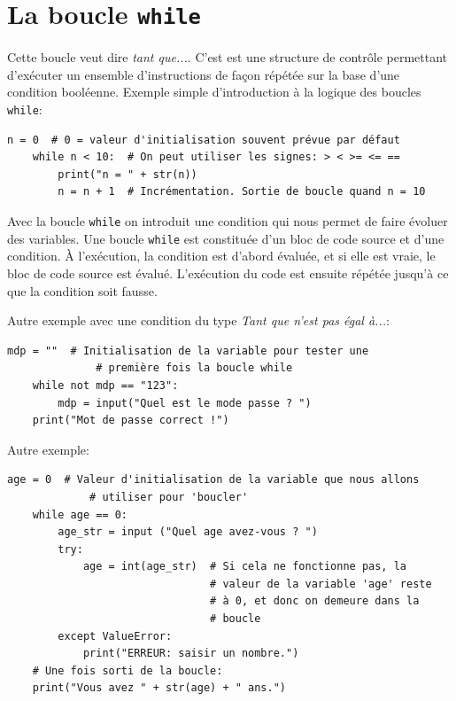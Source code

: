 \documentclass[a4paper,11pt]{book}
\begin{document}
\chapter{La boucle \texttt{while}}
Cette boucle veut dire \textit{tant que...}. C'est est une structure de contrôle permettant d'exécuter un ensemble d'instructions de façon répétée sur la base d'une condition booléenne. Exemple simple d'introduction à la logique des boucles \texttt{while}:
\begin{lstlisting}[caption=Premier exemple avec la boucle \textit{while}]
    n = 0  # 0 = valeur d'initialisation souvent prévue par défaut
    while n < 10:  # On peut utiliser les signes: > < >= <= ==
        print("n = " + str(n))
        n = n + 1  # Incrémentation. Sortie de boucle quand n = 10
\end{lstlisting}
\medskip

Avec la boucle \texttt{while} on introduit une condition qui nous permet de faire évoluer des variables. Une boucle \texttt{while} est constituée d’un bloc de code source et d’une condition. À l’exécution, la condition est d’abord évaluée, et si elle est vraie, le bloc de code source est évalué. L'exécution du code est ensuite répétée jusqu’à ce que la condition soit fausse. 
\medskip

Autre exemple avec une condition du type \textit{Tant que n'est pas égal à...}:
\begin{lstlisting}[caption=Deuxième exemple avec la boucle \textit{while}]
    mdp = ""  # Initialisation de la variable pour tester une
              # première fois la boucle while
    while not mdp == "123":
        mdp = input("Quel est le mode passe ? ")
    print("Mot de passe correct !")
\end{lstlisting}
\medskip

Autre exemple:
\begin{lstlisting}[caption=Troisième exemple avec la boucle \textit{while}]
    age = 0  # Valeur d'initialisation de la variable que nous allons  
             # utiliser pour 'boucler'
    while age == 0:
        age_str = input ("Quel age avez-vous ? ")
        try: 
            age = int(age_str)  # Si cela ne fonctionne pas, la  
                                # valeur de la variable 'age' reste  
                                # à 0, et donc on demeure dans la
                                # boucle
        except ValueError:
            print("ERREUR: saisir un nombre.")
    # Une fois sorti de la boucle:
    print("Vous avez " + str(age) + " ans.")  
\end{lstlisting}
\medskip
\end{document}
